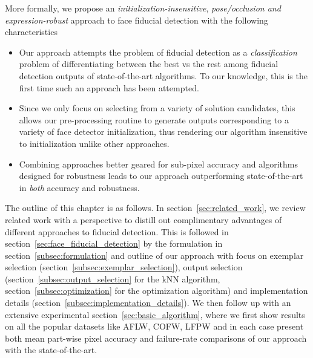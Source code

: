 More formally, we propose an \emph{initialization-insensitive}, \emph{pose/occlusion 
and expression-robust} approach to face fiducial detection with the following
characteristics
\begin{itemize}
  \item Our approach attempts the problem of fiducial detection as a \emph{classification}
    problem of differentiating between the best vs the rest among fiducial detection outputs
    of state-of-the-art algorithms. To our knowledge, this is the first time such an approach
    has been attempted.
  \item Since we only focus on selecting from a variety of solution candidates, this allows
    our pre-processing routine to generate outputs corresponding to a variety of face detector
    initialization, thus rendering our algorithm insensitive to initialization unlike
    other approaches.
  \item Combining approaches better geared for sub-pixel accuracy and algorithms designed
    for robustness leads to our approach outperforming state-of-the-art in \emph{both}
    accuracy and robustness.
\end{itemize}
   

The outline of this chapter is as follows. In section~\ref{sec:related_work}, we review related work
with a perspective to distill out complimentary advantages of different approaches to
fiducial detection. This is followed in section~\ref{sec:face_fiducial_detection} by the 
formulation in section~\ref{subsec:formulation} and outline 
of our approach with focus on exemplar selection (section~\ref{subsec:exemplar_selection}),
output selection (section~\ref{subsec:output_selection} for the kNN algorithm,
section~\ref{subsec:optimization} for the optimization algorithm) and implementation details
(section~\ref{subsec:implementation_details}). We then follow up with an extensive
experimental section~\ref{sec:basic_algorithm}, 
where we first show results on
all the popular datasets like AFLW, COFW, LFPW and in each case
present both mean part-wise pixel accuracy and failure-rate comparisons of our 
approach with the state-of-the-art.
